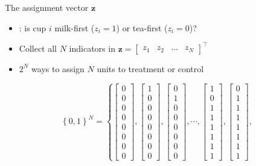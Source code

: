 \documentclass[table, xcolor = {dvipsnames}, 9pt]{beamer}
\theoremstyle{plain}
\newcommand{\mh}[1]{{\color{magenta}{#1}}}
\begin{document}
\begin{frame}{The assignment vector $\bm{z}$}
\vfill
\begin{itemize} \vfill
\item \mh{Treatment assignment}: is cup $i$ milk-first ($z_i = 1$) or tea-first ($z_i = 0$)? \vfill
\item Collect all $N$ indicators in $\bm{z} = \begin{bmatrix} z_1 & z_2 & \ldots & z_N \end{bmatrix}^{\top}$ \vfill
\item $2^N$ ways to assign $N$ units to treatment or control \vfill
\end{itemize} \vfill
\begin{equation*}
\left\{0, 1\right\}^N = \left\{
\begin{bmatrix} 0 \\ 0 \\ 0 \\ 0 \\ 0 \\ 0 \\ 0 \\ 0 \end{bmatrix},
\begin{bmatrix} 1 \\ 0 \\ 0 \\ 0 \\ 0 \\ 0 \\ 0 \\ 0 \end{bmatrix},
\begin{bmatrix} 0 \\ 1 \\ 0 \\ 0 \\ 0 \\ 0 \\ 0 \\ 0 \end{bmatrix},
\cdots ,
\begin{bmatrix} 1 \\ 0 \\ 1 \\ 1 \\ 1 \\ 1 \\ 1 \\ 1 \end{bmatrix},
\begin{bmatrix} 0 \\ 1 \\ 1 \\ 1 \\ 1 \\ 1 \\ 1 \\ 1 \end{bmatrix},

\end{equation*}
\end{frame}
\end{document}
